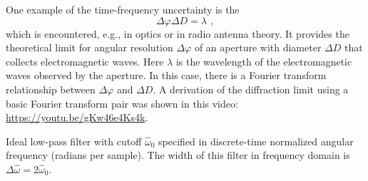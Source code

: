 One example of the time-frequency uncertainty is the \emph{}
\begin{equation}
\Delta \varphi \Delta D=\lambda \,\,,
\end{equation}
which is encountered, e.g., in optics or in radio antenna theory. It
provides the theoretical limit for angular resolution $\Delta \varphi$
of an aperture with diameter $\Delta D$ that collects electromagnetic
waves. Here $\lambda$ is the wavelength of the electromagnetic waves
observed by the aperture. In this case, there is a Fourier transform
relationship between $\Delta \varphi$ and $\Delta D$. A derivation of
the diffraction limit using a basic Fourier transform pair was shown
in this video: \url{https://youtu.be/gKw46e4Ks4k}.



\begin{marginfigure}[-5cm]
\begin{center}
\end{center}
\caption{Ideal low-pass filter with cutoff $\hat{\omega}_0$ specified in discrete-time normalized angular frequency (radians per sample). 
The width of this filter in frequency domain is $\Delta \hat{\omega} = 2\hat{\omega}_0$.}
\label{fig:ideal_lpf}
\end{marginfigure}

